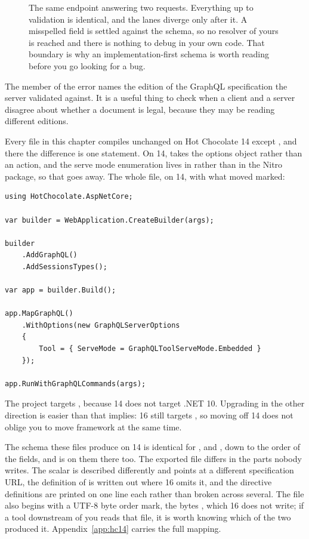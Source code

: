 \begin{figure}
  \centering
  
  \caption{The same endpoint answering two requests. Everything up to
  validation is identical, and the lanes diverge only after it. A misspelled
  field is settled against the schema, so no resolver of yours is reached and
  there is nothing to debug in your own code. That boundary is why an
  implementation-first schema is worth reading before you go looking for a bug.}
  \label{fig:ch02-two-requests}
\end{figure}

The  member of the error names the edition of the GraphQL
specification the server validated against. It is a useful thing to check when
a client and a server disagree about whether a document is legal, because they
may be reading different editions.
%

\begin{onhc14}
Every file in this chapter compiles unchanged on Hot Chocolate 14 except
, and there the difference is one statement. On 14,
 takes the options object rather than an action, and the
serve mode enumeration lives in  rather than in
the Nitro package, so that  goes away. The whole file, on 14, with
what moved marked:

\begin{verbatim}
using HotChocolate.AspNetCore;

var builder = WebApplication.CreateBuilder(args);

builder
    .AddGraphQL()
    .AddSessionsTypes();

var app = builder.Build();

app.MapGraphQL()
    .WithOptions(new GraphQLServerOptions
    {
        Tool = { ServeMode = GraphQLToolServeMode.Embedded }
    });

app.RunWithGraphQLCommands(args);
\end{verbatim}

The project targets , because 14 does not target .NET 10.
Upgrading in the other direction is easier than that implies: 16 still targets
, so moving off 14 does not oblige you to move framework at the
same time.

The schema these files produce on 14 is identical for ,
 and , down to the order of the fields, and
 is on them there too. The exported file differs in the parts
nobody writes. The  scalar is described differently and points
at a different specification URL, the definition of  is
written out where 16 omits it, and the directive definitions are printed on one
line each rather than broken across several. The file also begins with a UTF-8
byte order mark, the bytes , which 16 does not write; if a tool
downstream of you reads that file, it is worth knowing which of the two
produced it. Appendix~\ref{app:hc14} carries the full mapping.
\end{onhc14}
